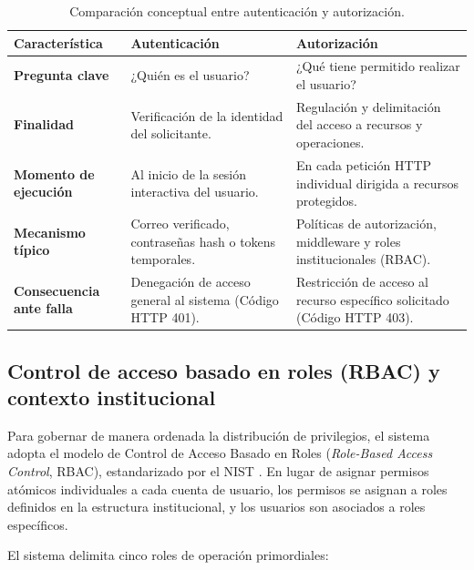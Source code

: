 \begin{table}[htbp]
\centering
\caption{Comparación conceptual entre autenticación y autorización.}
\label{tabla:autenticacion_autorizacion}
\small
\begin{tabularx}{\textwidth}{|p{3.5cm}|X|X|}
\hline
\rowcolor[gray]{0.9}
\textbf{Característica} & \textbf{Autenticación} & \textbf{Autorización} \\
\hline
\textbf{Pregunta clave} & ¿Quién es el usuario? & ¿Qué tiene permitido realizar el usuario? \\
\hline
\textbf{Finalidad} & Verificación de la identidad del solicitante. & Regulación y delimitación del acceso a recursos y operaciones. \\
\hline
\textbf{Momento de ejecución} & Al inicio de la sesión interactiva del usuario. & En cada petición HTTP individual dirigida a recursos protegidos. \\
\hline
\textbf{Mecanismo típico} & Correo verificado, contraseñas hash o tokens temporales. & Políticas de autorización, middleware y roles institucionales (RBAC). \\
\hline
\textbf{Consecuencia ante falla} & Denegación de acceso general al sistema (Código HTTP 401). & Restricción de acceso al recurso específico solicitado (Código HTTP 403). \\
\hline
\end{tabularx}
\end{table}

\subsection{Control de acceso basado en roles (RBAC) y contexto institucional}

Para gobernar de manera ordenada la distribución de privilegios, el sistema adopta el modelo de Control de Acceso Basado en Roles (\textit{Role-Based Access Control}, RBAC), estandarizado por el NIST \cite{ferraiolo2001proposed}. En lugar de asignar permisos atómicos individuales a cada cuenta de usuario, los permisos se asignan a roles definidos en la estructura institucional, y los usuarios son asociados a roles específicos.

El sistema delimita cinco roles de operación primordiales:

